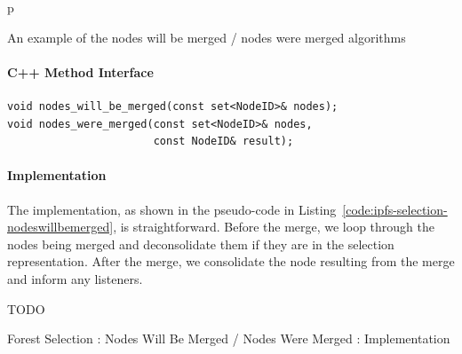 \begin{stusubfig}{p}
	\hspace{4mm}%
	\hspace{4mm}%
\caption{An example of the nodes will be merged / nodes were merged algorithms}
\label{fig:ipfs-selection-nodeswillbemerged}
\end{stusubfig}

\paragraph{C++ Method Interface}

\begin{lstlisting}[style=Prototype]
void nodes_will_be_merged(const set<NodeID>& nodes);
void nodes_were_merged(const set<NodeID>& nodes,
                       const NodeID& result);
\end{lstlisting}

\paragraph{Implementation}

The implementation, as shown in the pseudo-code in Listing~\ref{code:ipfs-selection-nodeswillbemerged}, is straightforward. Before the merge, we loop through the nodes being merged and deconsolidate them if they are in the selection representation. After the merge, we consolidate the node resulting from the merge and inform any listeners.

TODO

\begin{stulisting}[p]
\caption{Forest Selection : Nodes Will Be Merged / Nodes Were Merged : Implementation}
\label{code:ipfs-selection-nodeswillbemerged}

\end{stulisting}

